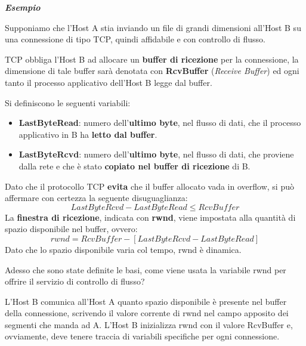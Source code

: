 \documentclass[a4paper]{article}
\begin{document}
	\begin{center}
		\large
		\textcolor{Green4}{\textbf{\emph{Esempio}}}
	\end{center}

	\noindent
	Supponiamo che l’\textsf{Host A} stia inviando un file di grandi dimensioni all’\textsf{Host B} su una connessione di tipo TCP, quindi affidabile e con controllo di flusso.\newline
	
	\noindent
	TCP obbliga l’\textsf{Host B} ad allocare un \textbf{buffer di ricezione} per la connessione, la dimensione di tale buffer sarà denotata con \textbf{\textsf{RcvBuffer}} (\emph{Receive Buffer}) ed ogni tanto il processo applicativo dell’\textsf{Host B} legge dal buffer.\newline
	
	\noindent
	Si definiscono le seguenti variabili:
	\begin{itemize}
		\item \textbf{\textsf{LastByteRead}}: numero dell'\textbf{ultimo byte}, nel flusso di dati, che il processo applicativo in B ha \textbf{letto dal buffer}.

		\item \textbf{\textsf{LastByteRcvd}}: numero dell'\textbf{ultimo byte}, nel flusso di dati, che proviene dalla rete e che è stato \textbf{copiato nel buffer di ricezione} di B.
	\end{itemize}
	Dato che il protocollo TCP \textbf{evita} che il buffer allocato vada in overflow, si può affermare con certezza la seguente disuguaglianza:
	\begin{equation*}
		LastByteRcvd - LastByteRead \le RcvBuffer
	\end{equation*}
	La \textbf{finestra di ricezione}, indicata con \textbf{\textsf{rwnd}}, viene impostata alla quantità di spazio disponibile nel buffer, ovvero:
	\begin{equation*}
		rwnd = RcvBuffer - \left[LastByteRcvd - LastByteRead\right]
	\end{equation*}
	Dato che lo spazio disponibile varia col tempo, \textsf{rwnd} è dinamica.\newline
	
	\noindent
	Adesso che sono state definite le basi, come viene usata la variabile rwnd per offrire il servizio di controllo di flusso?\newline
	
	\noindent
	L’\textsf{Host B} comunica all’\textsf{Host A} quanto spazio disponibile è presente nel buffer della connessione, scrivendo il valore corrente di \textsf{rwnd} nel campo apposito dei segmenti che manda ad A. L’\textsf{Host B} inizializza \textsf{rwnd} con il valore \textsf{RcvBuffer} e, ovviamente, deve tenere traccia di variabili specifiche per ogni connessione.\newline
	
\end{document}
